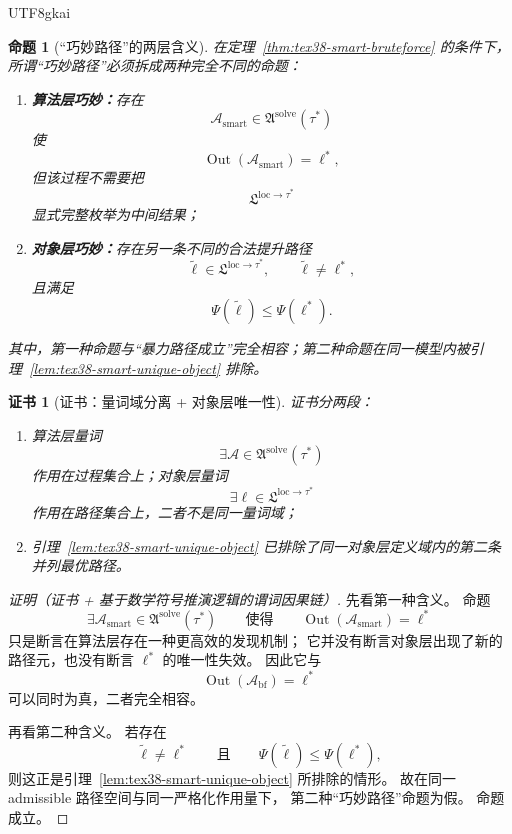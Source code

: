 \documentclass[12pt]{article}
\newtheorem{proposition}{命题}[section]
\newtheorem{Certificate}{证书}[section]
\begin{document}
\begin{CJK*}{UTF8}{gkai}
\begin{proposition}[“巧妙路径”的两层含义]
\label{prop:tex38-smart-two-senses}
在定理~\ref{thm:tex38-smart-bruteforce} 的条件下，所谓“巧妙路径”必须拆成两种完全不同的命题：
\begin{enumerate}
  \item \textbf{算法层巧妙：}存在
  \[
    \mathcal A_{\mathrm{smart}}\in\mathfrak A^{\mathrm{solve}}(\tau^\ast)
  \]
  使
  \[
    \operatorname{Out}(\mathcal A_{\mathrm{smart}})=\ell^\ast,
  \]
  但该过程不需要把
  \[
    \mathfrak L^{\mathrm{loc}\to\tau^\ast}
  \]
  显式完整枚举为中间结果；
  \item \textbf{对象层巧妙：}存在另一条不同的合法提升路径
  \[
    \widetilde\ell\in\mathfrak L^{\mathrm{loc}\to\tau^\ast},
    \qquad
    \widetilde\ell\neq\ell^\ast,
  \]
  且满足
  \[
    \Psi(\widetilde\ell)\le\Psi(\ell^\ast).
  \]
\end{enumerate}
其中，第一种命题与“暴力路径成立”完全相容；第二种命题在同一模型内被引理~\ref{lem:tex38-smart-unique-object} 排除。
\end{proposition}

\begin{Certificate}[证书：量词域分离 + 对象层唯一性]
\label{cert:tex38-smart-two-senses}
证书分两段：
\begin{enumerate}
  \item 算法层量词
  \[
    \exists \mathcal A\in\mathfrak A^{\mathrm{solve}}(\tau^\ast)
  \]
  作用在\emph{过程集合}上；对象层量词
  \[
    \exists \ell\in\mathfrak L^{\mathrm{loc}\to\tau^\ast}
  \]
  作用在\emph{路径集合}上，二者不是同一量词域；
  \item 引理~\ref{lem:tex38-smart-unique-object} 已排除了同一对象层定义域内的第二条并列最优路径。
\end{enumerate}
\end{Certificate}

\begin{proof}[证明（证书 + 基于数学符号推演逻辑的谓词因果链）]
先看第一种含义。
命题
\[
  \exists \mathcal A_{\mathrm{smart}}\in\mathfrak A^{\mathrm{solve}}(\tau^\ast)
  \qquad\text{使得}\qquad
  \operatorname{Out}(\mathcal A_{\mathrm{smart}})=\ell^\ast
\]
只是断言在算法层存在一种更高效的发现机制；
它并没有断言对象层出现了新的路径元，也没有断言 $\ell^\ast$ 的唯一性失效。
因此它与
\[
  \operatorname{Out}(\mathcal A_{\mathrm{bf}})=\ell^\ast
\]
可以同时为真，二者完全相容。

再看第二种含义。
若存在
\[
  \widetilde\ell\neq\ell^\ast
  \qquad\text{且}\qquad
  \Psi(\widetilde\ell)\le\Psi(\ell^\ast),
\]
则这正是引理~\ref{lem:tex38-smart-unique-object} 所排除的情形。
故在同一 admissible 路径空间与同一严格化作用量下，
第二种“巧妙路径”命题为假。
命题成立。
\end{proof}


\end{CJK*}
\end{document}
